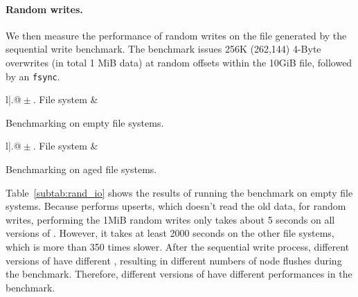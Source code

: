 \paragraph{Random writes.}

We then measure the performance of random writes on the file generated by the
sequential write benchmark.
The benchmark issues 256K (262,144) 4-Byte overwrites (in total 1 MiB data) at
random offsets within the 10GiB file, followed by an \texttt{fsync}.

\begin{table}[t]
    \begin{subtable}[b]{.5\textwidth}
    \centering
        \begin{tabular}{l|.@{${}\pm{}$}.}
        \hline
        File system &  \\
        \hline
        \hline
        
        \hline
        \end{tabular}
        \caption{\label{subtab:rand_io}Benchmarking on empty file systems.}
    \end{subtable}
    \begin{subtable}[b]{.5\textwidth}
    \centering
        \begin{tabular}{l|.@{${}\pm{}$}.}
        \hline
        File system &  \\
        \hline
        \hline
        
        \hline
        \end{tabular}
        \caption{\label{subtab:rand_io_aged}Benchmarking on aged file systems.}
    \end{subtable}
    \caption[Random-write benchmark]{\label{tab:rand_io}
        Time to perform 256K (262,144) 4-Byte random writes on a 10GiB file (1 MiB total IO, lower is better).}
\end{table}

Table~\ref{subtab:rand_io} shows the results of running the benchmark
on empty file systems.
Because \betrfs performs upserts, which doesn't read the old data, for random
writes, performing the 1MiB random writes only takes about 5 seconds on all
versions of \betrfs.
However, it takes at least 2000 seconds on the other file systems, which is
more than 350 times slower.
After the sequential write process, different versions of \betrfs have
different \bets, resulting in different numbers of node flushes during the
benchmark.
Therefore, different versions of \betrfs have different performances in the
benchmark.

